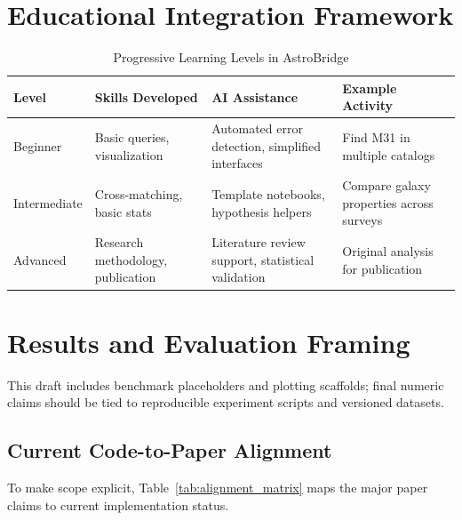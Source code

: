 \documentclass[10pt]{article}
\begin{document}
\section{Educational Integration Framework}
\label{sec:education}

\begin{table}[H]
\centering
\scriptsize
\caption{Progressive Learning Levels in AstroBridge}
\label{tab:learning_levels}
\begin{tabular}{p{3cm} p{4cm} p{4cm} p{4cm}}
\toprule
\textbf{Level} & \textbf{Skills Developed} & \textbf{AI Assistance} & \textbf{Example Activity} \\
\midrule
Beginner & Basic queries, visualization & Automated error detection, simplified interfaces & Find M31 in multiple catalogs \\
Intermediate & Cross-matching, basic stats & Template notebooks, hypothesis helpers & Compare galaxy properties across surveys \\
Advanced & Research methodology, publication & Literature review support, statistical validation & Original analysis for publication \\
\bottomrule
\end{tabular}
\end{table}

\section{Results and Evaluation Framing}
\label{sec:results}

This draft includes benchmark placeholders and plotting scaffolds; final numeric claims should be tied to reproducible experiment scripts and versioned datasets.

\subsection{Current Code-to-Paper Alignment}
To make scope explicit, Table~\ref{tab:alignment_matrix} maps the major paper claims to current implementation status.
\end{document}
